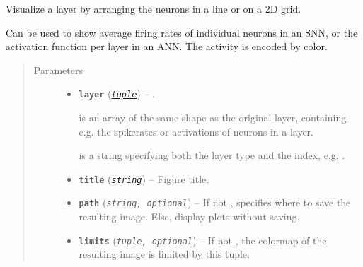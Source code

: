 \documentclass[letterpaper,10pt,english]{sphinxmanual}
\begin{document}
\begin{fulllineitems}
\label{snntoolbox.io_utils:snntoolbox.io_utils.plotting.plot_layer_activity}
Visualize a layer by arranging the neurons in a line or on a 2D grid.

Can be used to show average firing rates of individual neurons in an SNN,
or the activation function per layer in an ANN.
The activity is encoded by color.
\begin{quote}\begin{description}
\item[{Parameters}] \leavevmode\begin{itemize}
\item {} 
\textbf{\texttt{layer}} (\href{https://docs.python.org/library/functions.html\#tuple}{\emph{\texttt{tuple}}}) -- 
.

 is an array of the same shape as the original layer,
containing e.g. the spikerates or activations of neurons in a layer.

 is a string specifying both the layer type and the index,
e.g. .


\item {} 
\textbf{\texttt{title}} (\href{https://docs.python.org/library/string.html\#module-string}{\emph{\texttt{string}}}) -- Figure title.

\item {} 
\textbf{\texttt{path}} (\emph{\texttt{string, optional}}) -- If not , specifies where to save the resulting image. Else,
display plots without saving.

\item {} 
\textbf{\texttt{limits}} (\emph{\texttt{tuple, optional}}) -- If not , the colormap of the resulting image is limited by this
tuple.

\end{itemize}

\end{description}\end{quote}

\end{fulllineitems}

\end{document}
